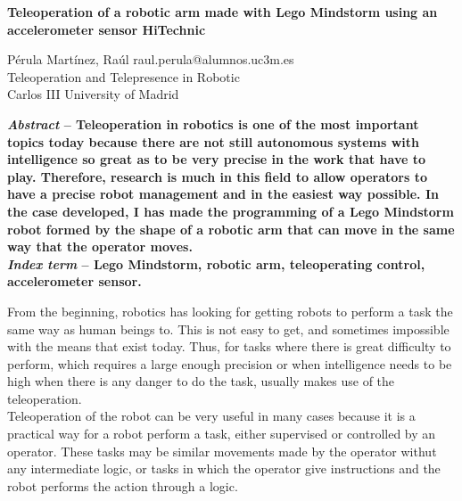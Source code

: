 \documentclass[a4paper,11pt]{article}
\begin{document}
	\renewcommand{\thepage}{\arabic{page}}
	\setcounter{page}{1}
	
	\begin{center}
	
		\textbf{\LARGE{Teleoperation of a robotic arm made with Lego Mindstorm using an accelerometer sensor HiTechnic}}
		\vspace{0.5cm}
		
		Pérula Martínez, Raúl \flqq raul.perula@alumnos.uc3m.es \frqq\\
		Teleoperation and Telepresence in Robotic\\
		Carlos III University of Madrid
	
	\end{center}
	
	\begin{multicols}{2}

		\textbf{\textit{Abstract} -- Teleoperation in robotics is one of the most important topics today because there are not still autonomous systems with intelligence so great as to be very precise in the work that have to play. Therefore, research is much in this field to allow operators to have a precise robot management and in the easiest way possible. In the case developed, I has made the programming of a Lego Mindstorm robot formed by the shape of a robotic arm that can move in the same way that the operator moves.}\\

		\textbf{\textit{Index term} -- Lego Mindstorm, robotic arm, teleoperating control, accelerometer sensor.}
		

			From the beginning, robotics has looking for getting robots to perform a task the same way as human beings to. This is not easy to get, and sometimes impossible with the means that exist today. Thus, for tasks where there is great difficulty to perform, which requires a large enough precision or when intelligence needs to be high when there is any danger to do the task, usually makes use of the teleoperation.\\

			Teleoperation of the robot can be very useful in many cases because it is a practical way for a robot perform a task, either supervised or controlled by an operator. These tasks may be similar movements made by the operator withut any intermediate logic, or tasks in which the operator give instructions and the robot performs the action through a logic.\\


\end{multicols}
\end{document}
